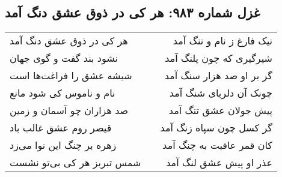\begin{center}
\section*{غزل شماره ۹۸۳: هر کی در ذوق عشق دنگ آمد}
\label{sec:0983}
\begin{longtable}{l p{0.5cm} r}
هر کی در ذوق عشق دنگ آمد
&&
نیک فارغ ز نام و ننگ آمد
\\
نشود بند گفت و گوی جهان
&&
شیرگیری که چون پلنگ آمد
\\
شیشه عشق را فراغت‌ها است
&&
گر بر او صد هزار سنگ آمد
\\
نام و ناموس کی شود مانع
&&
چونک آن دلربای شنگ آمد
\\
صد هزاران چو آسمان و زمین
&&
پیش جولان عشق تنگ آمد
\\
قیصر روم عشق غالب باد
&&
گر کسل چون سپاه زنگ آمد
\\
زهره بر چنگ این نوا می‌زد
&&
کان قمر عاقبت به چنگ آمد
\\
شمس تبریز هر کی بی‌تو نشست
&&
عذر او پیش عشق لنگ آمد
\\
\end{longtable}
\end{center}
